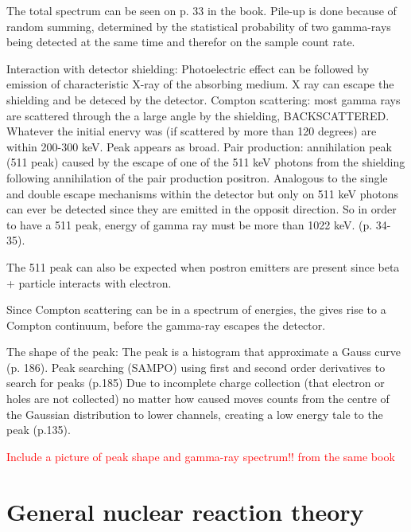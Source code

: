 The total spectrum can be seen on p. 33 in the book. Pile-up is done because of random summing, determined by the statistical probability of two gamma-rays being detected at the same time and therefor on the sample count rate. 

Interaction with detector shielding: Photoelectric effect can be followed by emission of characteristic X-ray of the absorbing medium. X ray can escape the shielding and be deteced by the detector. Compton scattering: most gamma rays are scattered through the a large angle by the shielding, BACKSCATTERED. Whatever the initial enervy  was (if scattered by more than 120 degrees) are within 200-300 keV. Peak appears as broad. Pair production: annihilation peak (511 peak) caused by the escape of one of the 511 keV photons from the shielding following annihilation of the pair production positron. Analogous to the single and double escape mechanisms within the detector but only on 511 keV photons can ever be detected since they are emitted in the opposit direction. So in order to have a 511 peak, energy of gamma ray must be more than 1022 keV. (p. 34-35).

The 511 peak can also be expected when postron emitters are present since beta + particle interacts with electron.  

Since Compton scattering can be in a spectrum of energies, the gives rise to a Compton continuum, before the gamma-ray escapes the detector. 


The shape of the peak: The peak is a histogram that approximate a Gauss curve (p. 186). Peak searching (SAMPO) using first and second order derivatives to search for peaks (p.185)
Due to incomplete charge collection (that electron or holes are not collected) no matter how caused moves counts from the centre of the Gaussian distribution to lower channels, creating a low energy tale to the peak (p.135).  

\textcolor{red}{Include a picture of peak shape and gamma-ray spectrum!! from the same book}


\section{General nuclear reaction theory}

